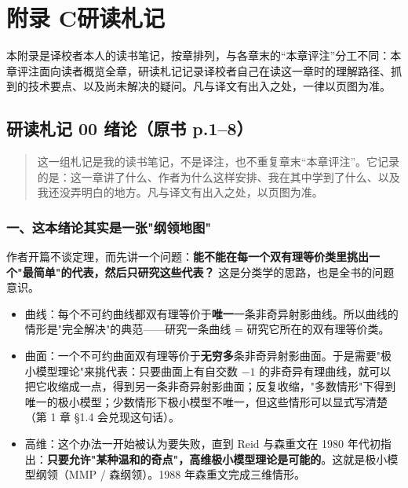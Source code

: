 \chapter*{附录 C\quad 研读札记}

本附录是译校者本人的读书笔记，按章排列，与各章末的“本章评注”分工不同：本章评注面向读者概览全章，研读札记记录译校者自己在读这一章时的理解路径、抓到的技术要点、以及尚未解决的疑问。凡与译文有出入之处，一律以页图为准。

\section*{研读札记 00 \textperiodcentered{} 绪论（原书 p.1--8）}

\begin{quote}\small 这一组札记是我的读书笔记，不是译注，也不重复章末“本章评注”。它记录的是：这一章讲了什么、作者为什么这样安排、我在其中学到了什么、以及我还没弄明白的地方。凡与译文有出入之处，以页图为准。\end{quote}

\subsection*{一、这本绪论其实是一张"纲领地图"}

作者开篇不谈定理，而先讲一个问题：\textbf{能不能在每一个双有理等价类里挑出一个"最简单"的代表，然后只研究这些代表？} 这是分类学的思路，也是全书的问题意识。

\begin{itemize}
\item 曲线：每个不可约曲线都双有理等价于\textbf{唯一}一条非奇异射影曲线。所以曲线的情形是"完全解决"的典范——研究一条曲线 = 研究它所在的双有理等价类。
\item 曲面：一个不可约曲面双有理等价于\textbf{无穷多}条非奇异射影曲面。于是需要"极小模型理论"来挑代表：只要曲面上有自交数 $-1$ 的非奇异有理曲线，就可以把它收缩成一点，得到另一条非奇异射影曲面；反复收缩，"多数情形"下得到唯一的极小模型；少数情形下极小模型不唯一，但这些情形可以显式写清楚（第 1 章 \S1.4 会兑现这句话）。
\item 高维：这个办法一开始被认为要失败，直到 Reid 与森重文在 1980 年代初指出：\textbf{只要允许"某种温和的奇点"，高维极小模型理论是可能的}。这就是极小模型纲领（MMP / 森纲领）。1988 年森重文完成三维情形。
\end{itemize}

